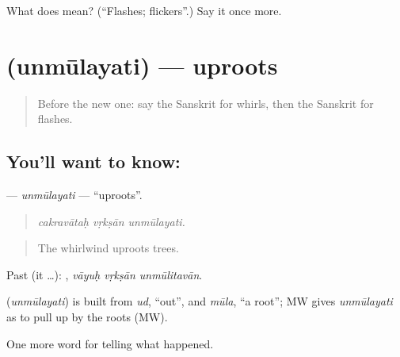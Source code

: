 \begin{tcolorbox}[breakable,colback=teal!4,colframe=teal!35!black,title={Before you move on}]
What does  mean? (\textquotedblleft{}Flashes; flickers\textquotedblright{}.) Say it once more.
\end{tcolorbox}
\section[\texorpdfstring{\sk{उन्मूलयति} (unmūlayati)}{उन्मूलयति (unmūlayati)}]{ (unmūlayati) — uproots}

\label{lesson:SA-C301-unmulayati}



\begin{quote}
Before the new one: say the Sanskrit for whirls, then the Sanskrit for flashes.
\end{quote}

\subsection*{You'll want to know: }
\textbf{} — \emph{unmūlayati} — \textquotedblleft{}uproots\textquotedblright{}.

\begin{quote}
  
\end{quote}

\begin{quote}
\emph{cakravātaḥ vṛkṣān unmūlayati.}
\end{quote}

\begin{quote}
The whirlwind uproots trees.
\end{quote}

Past (it …):   , \emph{vāyuḥ vṛkṣān unmūlitavān}.

\begin{cousinweb}
\textbf{} (\emph{unmūlayati}) is built from \emph{ud}, \textquotedblleft{}out\textquotedblright{}, and \emph{mūla}, \textquotedblleft{}a root\textquotedblright{}; MW gives \emph{unmūlayati} as to pull up by the roots (MW).
\end{cousinweb}

\begin{grammarlens}[title={What you've built}]
One more word for telling what happened.
\end{grammarlens}

